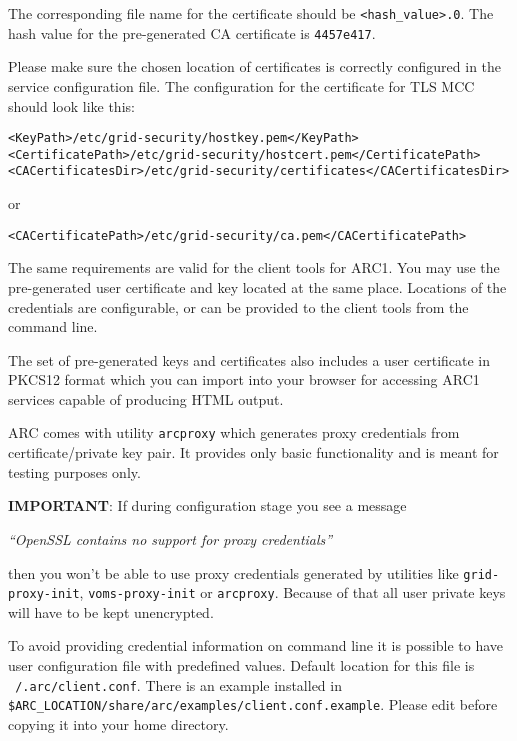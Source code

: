 \documentclass{article}                            %
\begin{document}
The corresponding file name for the certificate should be
\texttt{<hash\_value>.0}. The hash value for the pre-generated CA certificate is
\texttt{4457e417}.

Please make sure the chosen location of certificates is correctly configured in
the service configuration file. The configuration for the certificate for TLS
MCC should look like this:

\begin{lstlisting}
<KeyPath>/etc/grid-security/hostkey.pem</KeyPath>
<CertificatePath>/etc/grid-security/hostcert.pem</CertificatePath>
<CACertificatesDir>/etc/grid-security/certificates</CACertificatesDir>
\end{lstlisting}

or

\begin{lstlisting}
<CACertificatePath>/etc/grid-security/ca.pem</CACertificatePath>
\end{lstlisting}

The same requirements are valid for the client tools for ARC1. You may use the
pre-generated user certificate and key located at the same place. Locations of
the credentials are configurable, or can be provided to the client tools from
the command line.

The set of pre-generated keys and certificates also includes a user certificate
in PKCS12 format which you can import into your browser for accessing ARC1
services capable of producing HTML output.

ARC comes with utility \texttt{arcproxy} which generates proxy credentials from
certificate/private key pair. It provides only basic functionality and is meant
for testing purposes only.

\begin{framed}
\textbf{IMPORTANT}: If during configuration stage you see a message

 \textit{``OpenSSL contains no support for proxy credentials''}

then you won't be able to use proxy credentials generated by utilities
like \texttt{grid-proxy-init}, \texttt{voms-proxy-init} or \texttt{arcproxy}.
Because of that all user private keys will have to be kept unencrypted.
\end{framed}

To avoid providing credential information on command line it is possible to have
user configuration file with predefined values. Default location for this file
is \texttt{~/.arc/client.conf}. There is an example installed in
\verb|$ARC_LOCATION/share/arc/examples/client.conf.example|. Please edit before copying it
into your home directory.
\end{document}
